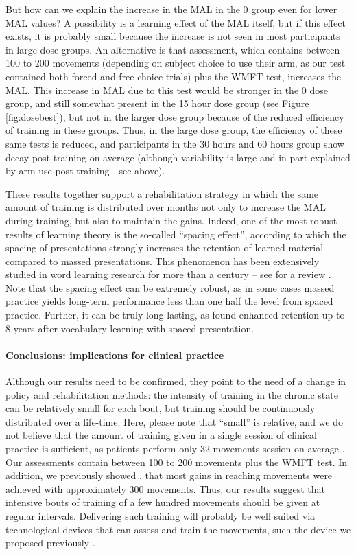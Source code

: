 But how can we explain the increase in the MAL in the 0 group even for lower MAL values? A possibility is a learning effect of the MAL itself, but if this effect exists, it is probably small because the increase is not seen in most participants in large dose groups. 
An alternative is that assessment, which contains between 100 to 200 movements (depending on subject choice to use their arm, as our test contained both forced and free choice trials) plus the WMFT test, increases the MAL. 
This increase in MAL due to this test would be stronger in the 0 dose group, and still somewhat present in the 15 hour dose group (see Figure \ref{fig:dosebest}), but not in the larger dose group because of the reduced efficiency of training in these groups. 
Thus, in the large dose group, the efficiency of these same tests is reduced, and participants in the 30 hours and 60 hours group show decay post-training on average (although variability is large and in part explained by arm use post-training - see above). 

These results together support a rehabilitation strategy in which the same amount of training is distributed over months not only to increase the MAL during training, but also to maintain the gains. 
Indeed, one of the most robust results of learning theory is the so-called “spacing effect”, according to which the spacing of presentations strongly increases the retention of learned material compared to massed presentations. 
This phenomenon has been extensively studied in word learning research for more than a century \cite{Ebbinghaus1913} – see for a review \cite{Druckman1991}. 
Note that the spacing effect can be extremely robust, as in some cases massed practice yields long-term performance less than one half the level from spaced practice. 
Further, it can be truly long-lasting, as \cite{Bahrick1987} found enhanced retention up to 8 years after vocabulary learning with spaced presentation. 

\paragraph{Conclusions: implications for clinical practice}
Although our results need to be confirmed, they point to the need of a change in policy and rehabilitation methods: the intensity of training in the chronic state can be relatively small for each bout, but training should be continuously distributed over a life-time. 
Here, please note that “small” is relative, and we do not believe that the amount of training  given in a single session of clinical practice is sufficient, as patients perform only 32 movements session on average \cite{Lang2009}. 
Our assessments contain between 100 to 200 movements plus the WMFT test. 
In addition, we previously showed \cite{Park2017}, that most gains in reaching movements were achieved with approximately 300 movements. 
Thus, our results suggest that intensive bouts of training of a few hundred movements should be given at regular intervals. 
Delivering such training will probably be well suited via technological devices that can assess and train the movements, such the device we proposed previously \cite{Park2016}. 


